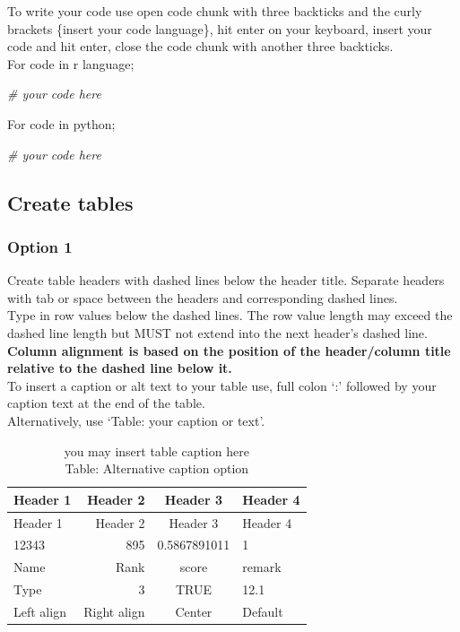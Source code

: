 \documentclass[
]{book}
\newenvironment{Shaded}{\begin{snugshade}}{\end{snugshade}}
\newcommand{\CommentTok}[1]{\textcolor[rgb]{0.56,0.35,0.01}{\textit{#1}}}
\begin{document}
To write your code use open code chunk with three backticks
and the curly brackets \{insert your code language\}, hit enter on your keyboard, insert your code and hit enter, close the code chunk with another three backticks.\\
For code in r language;

\begin{Shaded}
\begin{Highlighting}[]
\CommentTok{\# your code here}
\end{Highlighting}
\end{Shaded}

For code in python;

\begin{Shaded}
\begin{Highlighting}[]
\CommentTok{\# your code here}
\end{Highlighting}
\end{Shaded}

\hypertarget{create-tables}{%
\subsection{Create tables}\label{create-tables}}

\hypertarget{option-1}{%
\subsubsection{Option 1}\label{option-1}}

Create table headers with dashed lines below the header title. Separate headers with tab or space between the headers and corresponding dashed lines.\\
Type in row values below the dashed lines. The row value length may exceed the dashed line length but MUST not extend into the next header's dashed line.\\
\textbf{Column alignment is based on the position of the header/column title relative to the dashed line below it.}\\
To insert a caption or alt text to your table use, full colon `:' followed by your caption text at the end of the table.\\
Alternatively, use `Table: your caption or text'.

\begin{longtable}[]{@{}lrcl@{}}
\caption{you may insert table caption here\\
Table: Alternative caption option}\tabularnewline
\toprule
Header 1 & Header 2 & Header 3 & Header 4 \\
\midrule
\endfirsthead
\toprule
Header 1 & Header 2 & Header 3 & Header 4 \\
\midrule
\endhead
12343 & 895 & 0.5867891011 & 1 \\
Name & Rank & score & remark \\
Type & 3 & TRUE & 12.1 \\
Left align & Right align & Center & Default \\
\bottomrule
\end{longtable}
\end{document}
